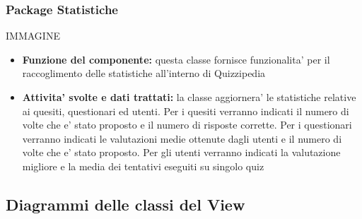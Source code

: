 \documentclass[a4paper,11pt]{article}
\begin{document}
			\subsubsection{Package Statistiche}
			IMMAGINE
 			\begin{itemize}
		    	\item\textbf{Funzione del componente:} questa classe fornisce funzionalita' per il raccoglimento delle statistiche all'interno di Quizzipedia
			\item\textbf{Attivita' svolte e dati trattati:} la classe aggiornera' le statistiche relative ai quesiti, questionari ed utenti.
			Per i quesiti verranno indicati il numero di volte che e' stato proposto e il numero di risposte corrette.
			Per i questionari verranno indicati le valutazioni medie ottenute dagli utenti e il numero di volte che e' stato proposto.
			Per gli utenti verranno indicati la valutazione migliore e la media dei tentativi eseguiti su singolo quiz
			\end{itemize}
			
			\subsection{Diagrammi delle classi del View}
\end{document}

